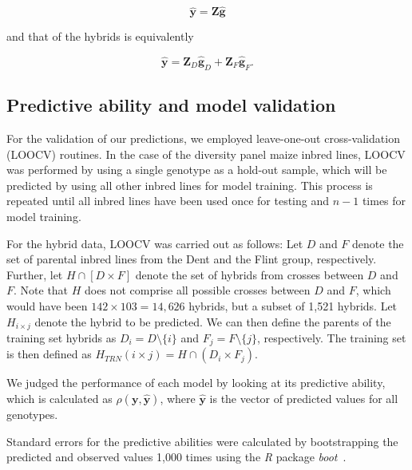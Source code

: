 \documentclass[12pt,titlepage]{article}
\begin{document}
\begin{equation} \label{eq:inbred-predicted-performance}
\hat{\mathbf{y}} = \mathbf{Z}\mathbf{\hat{g}} 
\end{equation}

and that of the hybrids is equivalently

\begin{equation} \label{eq:inbred-predicted-performance}
\hat{\mathbf{y}} = \mathbf{Z}_{D}\mathbf{\hat{g}}_{D} + \mathbf{Z}_{F}\mathbf{\hat{g}}_{F}.
\end{equation}

\subsection{Predictive ability and model validation}
For the validation of our predictions, we employed leave-one-out
cross-validation (LOOCV) routines.
In the case of the diversity panel maize inbred lines, LOOCV was performed by 
using a single genotype as a hold-out sample, which will be predicted by using
all other inbred lines for model training.
This process is repeated until all inbred lines have been used once for testing
and $n - 1$ times for model training.

For the hybrid data, LOOCV was carried out as follows:
Let $D$ and $F$ denote the set of parental inbred lines from the Dent and the 
Flint group, respectively.
Further, let $H \cap [D \times F]$ denote the set of hybrids from crosses 
between $D$ and $F$.
Note that $H$ does not comprise all possible crosses between $D$ and $F$,
which would have been $142 \times 103 = 14,626$ hybrids, but a subset of 1,521
hybrids.
Let $H_{i \times j}$ denote the hybrid to be predicted.
We can then define the parents of the training set hybrids as
$D_{i} = D \setminus \{i\}$ and $F_{j} = F \setminus \{j\}$, respectively.
The training set is then defined as 
$H_{TRN}(i \times j) = H \cap (D_{i} \times F_{j})$.

We judged the performance of each model by looking at its predictive ability,
which is calculated as $\rho(\mathbf{y}, \mathbf{\hat{y}})$, where 
$\mathbf{\hat{y}}$ is the vector of predicted values for all genotypes.

Standard errors for the predictive abilities were calculated by bootstrapping
the predicted and observed values 1,000 times using the \emph{R} package 
\emph{boot}~\cite{Canty2017}.
\end{document}
